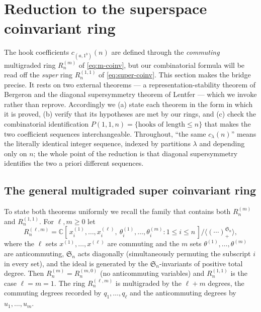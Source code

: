 \documentclass[11pt]{amsart}
\theoremstyle{definition}
\newcommand{\C}{\mathbb{C}}
\begin{document}
\section{Reduction to the superspace coinvariant ring}\label{sec:reduction}

The hook coefficients $c_{(a,1^b)}(n)$ are defined through the \emph{commuting}
multigraded ring $R_n^{(m)}$ of \eqref{eq:m-coinv}, but our combinatorial formula
will be read off the \emph{super} ring $R_n^{(1,1)}$ of \eqref{eq:super-coinv}.
This section makes the bridge precise. It rests on two external theorems
--- a representation-stability theorem of Bergeron \cite{Bergeron2020} and the
diagonal supersymmetry theorem of Lentfer \cite{Lentfer-Supersymmetry} --- which
we invoke rather than reprove. Accordingly we (a) state each theorem in the form
in which it is proved, (b) verify that its hypotheses are met by our rings, and
(c) check the combinatorial identification $P(1,1,n)=\{\text{hooks of length}\le n\}$
that makes the two coefficient sequences interchangeable. Throughout, ``the same
$c_\lambda(n)$'' means the literally identical integer sequence, indexed by
partitions $\lambda$ and depending only on $n$; the whole point of the reduction
is that diagonal supersymmetry identifies the two a priori different sequences.

\subsection{The general multigraded super coinvariant ring}
To state both theorems uniformly we recall the family that contains both
$R_n^{(m)}$ and $R_n^{(1,1)}$. For $\ell,m\ge0$ let
\begin{equation}\label{eq:super-mixed}
R_n^{(\ell,m)}
= \C[\,x_i^{(1)},\dots,x_i^{(\ell)},\ \theta_i^{(1)},\dots,\theta_i^{(m)}: 1\le i\le n\,]
\big/\big\langle (\cdots)_+^{\mathfrak{S}_n}\big\rangle,
\end{equation}
where the $\ell$ sets $x^{(1)},\dots,x^{(\ell)}$ are commuting and the $m$ sets
$\theta^{(1)},\dots,\theta^{(m)}$ are anticommuting, $\mathfrak{S}_n$ acts
diagonally (simultaneously permuting the subscript $i$ in every set), and the
ideal is generated by the $\mathfrak{S}_n$-invariants of positive total degree.
Then $R_n^{(m)}=R_n^{(m,0)}$ (no anticommuting variables) and
$R_n^{(1,1)}$ is the case $\ell=m=1$. The ring $R_n^{(\ell,m)}$ is multigraded by
the $\ell+m$ degrees, the commuting degrees recorded by $q_1,\dots,q_\ell$ and the
anticommuting degrees by $u_1,\dots,u_m$.
\end{document}
